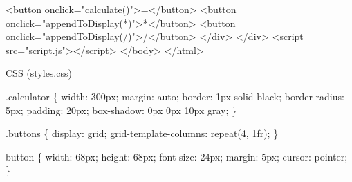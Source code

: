 \documentclass[
  letterpaper,
]{book}
\newenvironment{Shaded}{\begin{snugshade}}{\end{snugshade}}
\newcommand{\BuiltInTok}[1]{\textcolor[rgb]{0.00,0.23,0.31}{#1}}
\newcommand{\ConstantTok}[1]{\textcolor[rgb]{0.56,0.35,0.01}{#1}}
\newcommand{\DataTypeTok}[1]{\textcolor[rgb]{0.68,0.00,0.00}{#1}}
\newcommand{\DecValTok}[1]{\textcolor[rgb]{0.68,0.00,0.00}{#1}}
\newcommand{\ErrorTok}[1]{\textcolor[rgb]{0.68,0.00,0.00}{#1}}
\newcommand{\FunctionTok}[1]{\textcolor[rgb]{0.28,0.35,0.67}{#1}}
\newcommand{\KeywordTok}[1]{\textcolor[rgb]{0.00,0.23,0.31}{#1}}
\newcommand{\NormalTok}[1]{\textcolor[rgb]{0.00,0.23,0.31}{#1}}
\newcommand{\OperatorTok}[1]{\textcolor[rgb]{0.37,0.37,0.37}{#1}}
\newcommand{\OtherTok}[1]{\textcolor[rgb]{0.00,0.23,0.31}{#1}}
\newcommand{\StringTok}[1]{\textcolor[rgb]{0.13,0.47,0.30}{#1}}
\begin{document}
\begin{tcolorbox}
\begin{Shaded}
\begin{Highlighting}[]
      \DataTypeTok{\textless{}}\KeywordTok{button} \ErrorTok{onclick}\OtherTok{=}\StringTok{"calculate()"}\DataTypeTok{\textgreater{}}\NormalTok{=}\DataTypeTok{\textless{}/}\KeywordTok{button}\DataTypeTok{\textgreater{}}
      \DataTypeTok{\textless{}}\KeywordTok{button} \ErrorTok{onclick}\OtherTok{=}\StringTok{"appendToDisplay(\textquotesingle{}*\textquotesingle{})"}\DataTypeTok{\textgreater{}}\NormalTok{*}\DataTypeTok{\textless{}/}\KeywordTok{button}\DataTypeTok{\textgreater{}}
      \DataTypeTok{\textless{}}\KeywordTok{button} \ErrorTok{onclick}\OtherTok{=}\StringTok{"appendToDisplay(\textquotesingle{}/\textquotesingle{})"}\DataTypeTok{\textgreater{}}\NormalTok{/}\DataTypeTok{\textless{}/}\KeywordTok{button}\DataTypeTok{\textgreater{}}
    \DataTypeTok{\textless{}/}\KeywordTok{div}\DataTypeTok{\textgreater{}}
  \DataTypeTok{\textless{}/}\KeywordTok{div}\DataTypeTok{\textgreater{}}
  \DataTypeTok{\textless{}}\KeywordTok{script} \ErrorTok{src}\OtherTok{=}\StringTok{"script.js"}\DataTypeTok{\textgreater{}\textless{}/}\KeywordTok{script}\DataTypeTok{\textgreater{}}
\DataTypeTok{\textless{}/}\KeywordTok{body}\DataTypeTok{\textgreater{}}
\DataTypeTok{\textless{}/}\KeywordTok{html}\DataTypeTok{\textgreater{}}
\end{Highlighting}
\end{Shaded}

CSS (styles.css)

\begin{Shaded}
\begin{Highlighting}[]
\FunctionTok{.calculator}\NormalTok{ \{}
  \KeywordTok{width}\NormalTok{: }\DecValTok{300}\DataTypeTok{px}\OperatorTok{;}
  \KeywordTok{margin}\NormalTok{: }\BuiltInTok{auto}\OperatorTok{;}
  \KeywordTok{border}\NormalTok{: }\DecValTok{1}\DataTypeTok{px} \DecValTok{solid} \ConstantTok{black}\OperatorTok{;}
  \KeywordTok{border{-}radius}\NormalTok{: }\DecValTok{5}\DataTypeTok{px}\OperatorTok{;}
  \KeywordTok{padding}\NormalTok{: }\DecValTok{20}\DataTypeTok{px}\OperatorTok{;}
  \KeywordTok{box{-}shadow}\NormalTok{: }\DecValTok{0}\DataTypeTok{px} \DecValTok{0}\DataTypeTok{px} \DecValTok{10}\DataTypeTok{px} \ConstantTok{gray}\OperatorTok{;}
\NormalTok{\}}

\FunctionTok{.buttons}\NormalTok{ \{}
  \KeywordTok{display}\NormalTok{: }\DecValTok{grid}\OperatorTok{;}
  \KeywordTok{grid{-}template{-}columns}\NormalTok{: }\FunctionTok{repeat(}\DecValTok{4}\OperatorTok{,} \DecValTok{1}\DataTypeTok{fr}\FunctionTok{)}\OperatorTok{;}
\NormalTok{\}}

\NormalTok{button \{}
  \KeywordTok{width}\NormalTok{: }\DecValTok{68}\DataTypeTok{px}\OperatorTok{;}
  \KeywordTok{height}\NormalTok{: }\DecValTok{68}\DataTypeTok{px}\OperatorTok{;}
  \KeywordTok{font{-}size}\NormalTok{: }\DecValTok{24}\DataTypeTok{px}\OperatorTok{;}
  \KeywordTok{margin}\NormalTok{: }\DecValTok{5}\DataTypeTok{px}\OperatorTok{;}
  \KeywordTok{cursor}\NormalTok{: }\DecValTok{pointer}\OperatorTok{;}
\NormalTok{\}}


\end{Highlighting}
\end{Shaded}
\end{tcolorbox}
\end{document}

